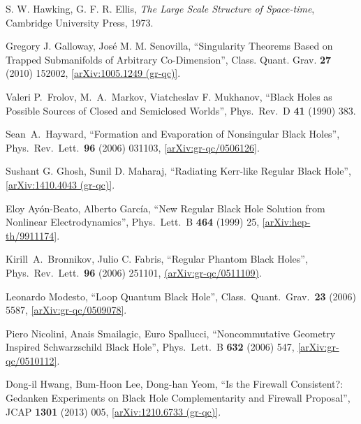 \documentclass[12pt]{article}
\newcommand{\2}{$^2$}
\newcommand{\3}{$^3$}
\newcommand{\4}{$_4$}
\newcommand{\5}{$_5$}
\begin{document}
\begin{thebibliography}{400}
S. W. Hawking, G. F. R. Ellis, \textit{The Large Scale Structure of Space-time}, Cambridge University Press, 1973. 

Gregory J. Galloway, Jos\'e M. M. Senovilla, ``Singularity Theorems Based on Trapped Submanifolds of Arbitrary Co-Dimension'', Class. Quant. Grav. \textbf{27} (2010) 152002,  \href{http://arxiv.org/abs/1005.1249}{[arXiv:1005.1249 (gr-qc)]}.

  Valeri P.~Frolov, M.~A.~Markov, Viatcheslav F. Mukhanov,
  ``Black Holes as Possible Sources of Closed and Semiclosed Worlds'',
  Phys.\ Rev.\ D {\bf 41} (1990) 383.

  Sean~A.~Hayward,
  ``Formation and Evaporation of Nonsingular Black Holes'',
  Phys.\ Rev.\ Lett.\  {\bf 96} (2006) 031103, \href{http://arxiv.org/abs/gr-qc/0506126}{[arXiv:gr-qc/0506126]}.
	
Sushant G. Ghosh, Sunil D. Maharaj, ``Radiating Kerr-like Regular Black Hole'', \href{http://arxiv.org/abs/1410.4043}{[arXiv:1410.4043 (gr-qc)]}. 

Eloy Ayón-Beato, Alberto García,
  ``New Regular Black Hole Solution from Nonlinear Electrodynamics'',
  Phys.\ Lett.\ B {\bf 464} (1999) 25, \href{http://arxiv.org/abs/hep-th/9911174}{[arXiv:hep-th/9911174]}.
	

  Kirill~A.~Bronnikov, Julio C. Fabris,
  ``Regular Phantom Black Holes'',
  Phys.\ Rev.\ Lett.\  {\bf 96} (2006) 251101, \href{http://arxiv.org/abs/gr-qc/0511109}{
  (arXiv:gr-qc/0511109)}.

  Leonardo Modesto,
  ``Loop Quantum Black Hole'', 
  Class.\ Quant.\ Grav.\  {\bf 23} (2006) 5587,
\href{http://arxiv.org/abs/gr-qc/0509078}{[arXiv:gr-qc/0509078]}.

Piero Nicolini, Anais Smailagic, Euro Spallucci,
  ``Noncommutative Geometry Inspired Schwarzschild Black Hole'',
  Phys.\ Lett.\ B {\bf 632} (2006) 547, \href{http://arxiv.org/abs/gr-qc/0510112}{[arXiv:gr-qc/0510112]}.

  Dong-il Hwang, Bum-Hoon Lee, Dong-han Yeom,
  ``Is the Firewall Consistent?: Gedanken Experiments on Black Hole Complementarity and Firewall Proposal'',
  JCAP {\bf 1301} (2013) 005, \href{http://arxiv.org/abs/1210.6733}{[arXiv:1210.6733 (gr-qc)]}.
	

\end{thebibliography}
\end{document}
